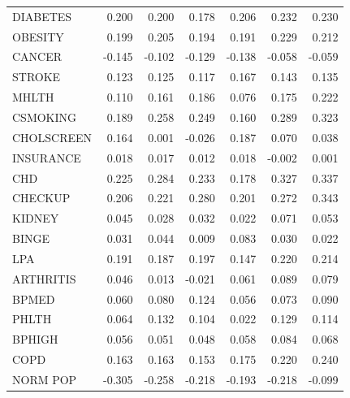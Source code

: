 \documentclass[letterpaper, inpress]{jds} %
\renewcommand{\_}{%
    \textunderscore\hspace{0pt}%
}
\begin{document}
\begin{table}[!h]
{\begin{tabular}{lrrrrrr}
DIABETES                & 0.200       & 0.200     & 0.178         & 0.206       & 0.232       & 0.230     \\
OBESITY                 & 0.199       & 0.205       & 0.194       & 0.191       & 0.229       & 0.212     \\
CANCER                  & -0.145      & -0.102      & -0.129      & -0.138      & -0.058      & -0.059    \\
STROKE                  & 0.123       & 0.125       & 0.117       & 0.167       & 0.143       & 0.135     \\
MHLTH                   & 0.110       & 0.161       & 0.186       & 0.076       & 0.175       & 0.222     \\
CSMOKING                & 0.189       & 0.258       & 0.249       & 0.160        & 0.289       & 0.323     \\
CHOLSCREEN              & 0.164       & 0.001       & -0.026      & 0.187       & 0.070       & 0.038     \\
INSURANCE               & 0.018       & 0.017       & 0.012       & 0.018       & -0.002      & 0.001     \\
CHD                     & 0.225       & 0.284       & 0.233       & 0.178       & 0.327       & 0.337     \\
CHECKUP                 & 0.206       & 0.221       & 0.280       & 0.201       & 0.272       & 0.343     \\
KIDNEY                  & 0.045       & 0.028       & 0.032       & 0.022       & 0.071       & 0.053     \\
BINGE                   & 0.031       & 0.044       & 0.009       & 0.083       & 0.030       & 0.022     \\
LPA                     & 0.191       & 0.187       & 0.197       & 0.147       & 0.220       & 0.214     \\
ARTHRITIS               & 0.046       & 0.013       & -0.021      & 0.061       & 0.089       & 0.079     \\
BPMED                   & 0.060       & 0.080        & 0.124       & 0.056       & 0.073      & 0.090      \\
PHLTH                   & 0.064       & 0.132       & 0.104       & 0.022       & 0.129       & 0.114     \\
BPHIGH                  & 0.056       & 0.051       & 0.048       & 0.058       & 0.084       & 0.068     \\
COPD                    & 0.163       & 0.163       & 0.153       & 0.175       & 0.220       & 0.240     \\
NORM\_POP               & -0.305      & -0.258      & -0.218      & -0.193      & -0.218      & -0.099  \\
\bottomrule
\end{tabular}
}
\end{table}
\end{document}
